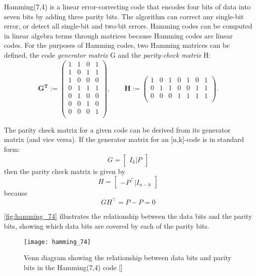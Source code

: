Hamming(7,4) is a linear error-correcting code that encodes four bits of data into seven bits by adding three parity bits. The algorithm can correct any single-bit error, or detect all single-bit and two-bit errors. Hamming codes can be computed in linear algebra terms through matrices because Hamming codes are linear codes. For the purposes of Hamming codes, two Hamming matrices can be defined, the code \emph{generator matrix} G and the \emph{parity-check matrix} H:
\begin{equation}
\mathbf{G^T} := \begin{pmatrix}
  1 & 1 & 0 & 1 \\
  1 & 0 & 1 & 1 \\
  1 & 0 & 0 & 0 \\
  0 & 1 & 1 & 1 \\
  0 & 1 & 0 & 0 \\
  0 & 0 & 1 & 0 \\
  0 & 0 & 0 & 1 \\
 \end{pmatrix}, \qquad \mathbf{H} := \begin{pmatrix}
  1 & 0 & 1 & 0 & 1 & 0 & 1 \\
  0 & 1 & 1 & 0 & 0 & 1 & 1 \\
  0 & 0 & 0 & 1 & 1 & 1 & 1 \\
 \end{pmatrix}.
\end{equation}

The parity check matrix for a given code can be derived from its generator matrix (and vice versa). If the generator matrix for an [n,k]-code is in standard form:
\begin{equation}
  G = \begin{bmatrix} I_k | P \end{bmatrix}
\end{equation}
then the parity check matrix is given by
\begin{equation}
  H = \begin{bmatrix} -P^{\top} | I_{n-k} \end{bmatrix}
\end{equation}
because
\begin{equation}
G H^{\top} = P-P = 0
\end{equation}

\autoref{fig:hamming_74} illustrates the relationship between the data bits and the parity bits, showing which data bits are covered by each of the parity bits.

\begin{figure}[H]
  \centering
  \texttt{[image: hamming\_74]}
  \caption{Venn diagram showing the relationship between data bits and parity bits in the Hamming(7,4) code [\citeauthor{image:hamming74_venn_diagram}]}
  \label{fig:hamming_74}
\end{figure}

